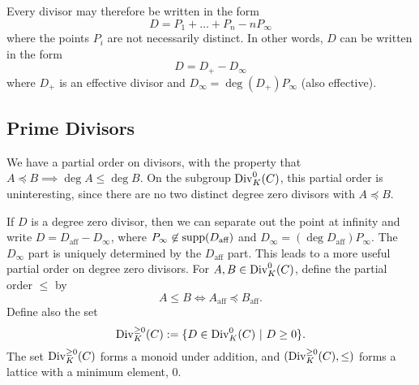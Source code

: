 Every divisor may therefore be written in the form
  \[ D = P_1 + \ldots + P_n - nP_\infty \]
where the points $P_i$ are not necessarily distinct.
In other words, $D$ can be written in the form
  \[ D = D_+ - D_\infty \]
where $D_+$ is an effective divisor and $D_\infty = \deg(D_+)P_\infty$ (also effective).
\begin{comment}
Unless otherwise specified, we will assume that a divisor $D$ is of this form.
Since $D_\infty$ is determined uniquely by $D^+$,
we will furthermore drop the $D_\infty$ part and denote $D$ by its positive part only.
That is, if $D = P + Q + R - 3P_\infty$, we will instead write simply $D = P + Q + R$ and call $D$ a degree 3 divisor.
\end{comment}




\subsection{Prime Divisors}
\label{sec_prime_divisors}

We have a partial order on divisors, with the property that $A \preceq B \implies \deg A \leq \deg B$.
On the subgroup $\operatorname{Div}_K^0(C)$, this partial order is uninteresting,
since there are no two distinct degree zero divisors with $A \preceq B$.

If $D$ is a degree zero divisor,
then we can separate out the point at infinity and write $D = D_{\text{aff}} - D_\infty$,
where $P_\infty \not\in \operatorname{supp}(D_{\text{aff}})$ and $D_\infty = (\deg D_{\text{aff}})P_\infty$.
The $D_\infty$ part is uniquely determined by the $D_{\text{aff}}$ part.
This leads to a more useful partial order on degree zero divisors.
For $A, B \in \operatorname{Div}_K^0(C)$, define the partial order $\leq$ by
  \[ A \leq B \iff A_{\text{aff}} \preceq B_{\text{aff}}. \]
Define also the set
  \[ \operatorname{Div}_K^{\geq 0}(C) := \{ D \in \operatorname{Div}_K^0(C) ~|~ D \geq 0 \}. \]
The set $\operatorname{Div}_K^{\geq 0}(C)$ forms a monoid under addition,
and $(\operatorname{Div}_K^{\geq 0}(C), \leq)$ forms a lattice with a minimum element, 0.

